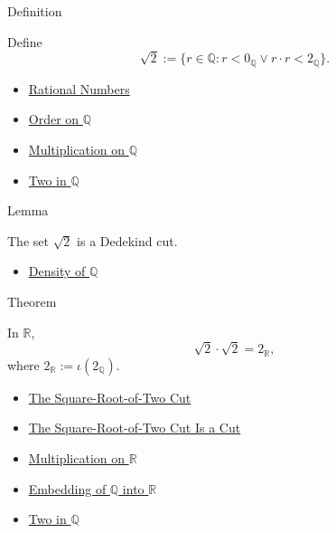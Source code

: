 \begin{definitionbox}{Definition}
\begin{definition}
\label{def:sqrt-two-cut}
Define
\[
\sqrt{2}:=\{r\in\mathbb{Q}:r<0_{\mathbb{Q}}\lor r\cdot r<2_{\mathbb{Q}}\}.
\]
\end{definition}
\end{definitionbox}

\begin{dependencies}
\begin{itemize}
  \item \hyperref[def:rationals]{Rational Numbers}
  \item \hyperref[def:order-on-q]{Order on $\mathbb{Q}$}
  \item \hyperref[def:multiplication-on-q-classes]{Multiplication on $\mathbb{Q}$}
  \item \hyperref[def:two-in-q]{Two in $\mathbb{Q}$}
\end{itemize}
\end{dependencies}

\begin{lemmabox}{Lemma}
\begin{lemma}
\label{lem:sqrt-two-is-a-cut}
The set $\sqrt{2}$ is a Dedekind cut.
\end{lemma}
\end{lemmabox}

\begin{dependencies}
\begin{itemize}
  \item \hyperref[thm:density-of-q]{Density of $\mathbb{Q}$}
\end{itemize}
\end{dependencies}

\begin{theorembox}{Theorem}
\begin{theorem}
\label{thm:sqrt-two-squared-is-two}
In $\mathbb{R}$,
\[
\sqrt{2}\cdot\sqrt{2}=2_{\mathbb{R}},
\]
where $2_{\mathbb{R}}:=\iota(2_{\mathbb{Q}})$.
\end{theorem}
\end{theorembox}

\begin{dependencies}
\begin{itemize}
  \item \hyperref[def:sqrt-two-cut]{The Square-Root-of-Two Cut}
  \item \hyperref[lem:sqrt-two-is-a-cut]{The Square-Root-of-Two Cut Is a Cut}
  \item \hyperref[def:multiplication-on-r]{Multiplication on $\mathbb{R}$}
  \item \hyperref[def:real-chapter-embedding-q-into-r]{Embedding of $\mathbb{Q}$ into $\mathbb{R}$}
  \item \hyperref[def:two-in-q]{Two in $\mathbb{Q}$}
\end{itemize}
\end{dependencies}

